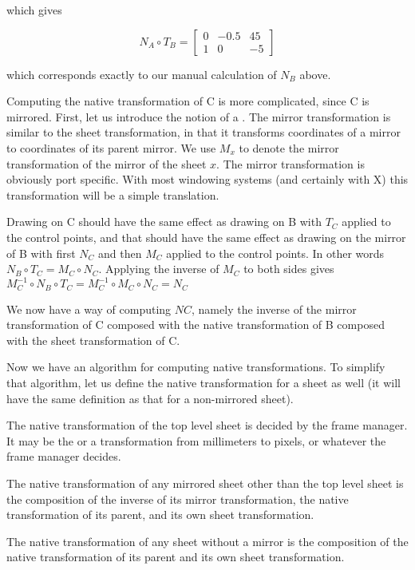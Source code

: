 which gives

\[ N_A \circ T_B = \left[ \begin{array}{ccc}
0 & -0.5 & 45\\
1 & 0 & -5
\end{array} \right] \]

which corresponds exactly to our manual calculation of $N_B$ above. 

Computing the native transformation of C is more complicated, since C
is mirrored.  First, let us introduce the notion of a .  The mirror transformation is similar to the sheet
transformation, in that it transforms coordinates of a mirror to
coordinates of its parent mirror.  We use $M_x$ to denote the mirror
transformation of the mirror of the sheet $x$.  The mirror
transformation is obviously port specific.  With most windowing
systems (and certainly with X) this transformation will be a simple
translation. 

Drawing on C should have the same effect as drawing on B with $T_C$
applied to the control points, and that should have the same effect as
drawing on the mirror of B with first $N_C$ and then $M_C$ applied 
to the control points.  In other words $N_B \circ T_C = M_C \circ
N_C$.  Applying the inverse of $M_C$ to both sides gives $M_C^{-1}
\circ N_B \circ T_C = M_C^{-1} \circ M_C \circ N_C = N_C$ 

We now have a way of computing $NC$, namely the inverse of the mirror
transformation of C composed with the native transformation of B
composed with the sheet transformation of C. 

Now we have an algorithm for computing native transformations.  To
simplify that algorithm, let us define the native transformation for a
 sheet as well (it will have the same definition as that
for a non-mirrored sheet). 

\begin{enumerate0}
  
\item The native transformation of the top level sheet is decided by
  the frame manager.  It may be the  or
  a transformation from millimeters to pixels, or whatever the frame
  manager decides.
  
\item The native transformation of any mirrored sheet other than the
  top level sheet is the composition of the inverse of its mirror
  transformation, the native transformation of its parent, and its own
  sheet transformation.
  
\item The native transformation of any sheet without a mirror is the
  composition of the native transformation of its parent and its own
  sheet transformation.
\end{enumerate0}

